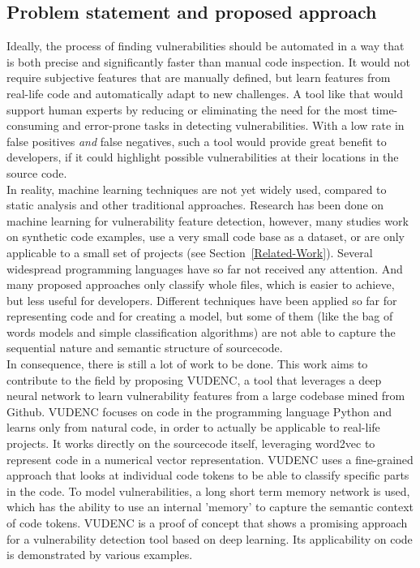 \documentclass[
a4paper,
pagesize,
pdftex,
12pt,
twoside, %
BCOR=5mm, %
ngerman,
fleqn,
final,
]{scrartcl}
\begin{document}
	\subsection{Problem statement and proposed approach}
	Ideally, the process of finding vulnerabilities should be automated in a way that is both precise and significantly faster than manual code inspection. It would not require subjective features that are manually defined, but learn features from real-life code and automatically adapt to new challenges. A tool like that would support human experts by reducing or eliminating the need for the most time-consuming and error-prone tasks in detecting vulnerabilities. With a low rate in false positives \textit{and} false negatives, such a tool would provide great benefit to developers, if it could highlight possible vulnerabilities at their locations in the source code.\\	
	In reality, machine learning techniques are not yet widely used, compared to static analysis and other traditional approaches. Research has been done on machine learning for vulnerability feature detection, however, many studies work on synthetic code examples, use a very small code base as a dataset, or are only applicable to a small set of projects (see Section~\ref{Related-Work}). Several widespread programming languages have so far not received any attention. And many proposed approaches only classify whole files, which is easier to achieve, but less useful for developers. Different techniques have been applied so far for representing code and for creating a model, but some of them (like the bag of words models and simple classification algorithms) are not able to capture the sequential nature and semantic structure of sourcecode.\\
	In consequence, there is still a lot of work to be done. This work aims to contribute to the field by proposing VUDENC, a tool that leverages a deep neural network to learn vulnerability features from a large codebase mined from Github. VUDENC focuses on code in the programming language Python and learns only from natural code, in order to actually be applicable to real-life projects. It works directly on the sourcecode itself, leveraging word2vec to represent code in a numerical vector representation. VUDENC uses a fine-grained approach that looks at individual code tokens to be able to classify specific parts in the code. To model vulnerabilities, a long short term memory network is used, which has the ability to use an internal 'memory' to capture the semantic context of code tokens. VUDENC is a proof of concept that shows a promising approach for a vulnerability detection tool based on deep learning. Its applicability on code is demonstrated by various examples. 
	
\end{document}

